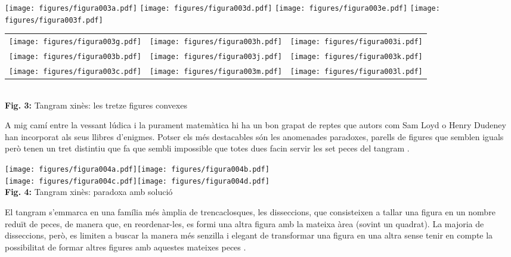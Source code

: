 \documentclass[a4paper,11pt]{article}
\begin{document}
\begin{multicols}{2}
            \begin{center}
                \texttt{[image: figures/figura003a.pdf]}\qquad
                \texttt{[image: figures/figura003d.pdf]}\qquad
                \texttt{[image: figures/figura003e.pdf]}\qquad
                \texttt{[image: figures/figura003f.pdf]}\\ \medskip
                \begin{tabular}{ccc}
                    \texttt{[image: figures/figura003g.pdf]} &
                    \texttt{[image: figures/figura003h.pdf]} &
                    \texttt{[image: figures/figura003i.pdf]} \\[1ex]
                    \texttt{[image: figures/figura003b.pdf]} &
                    \texttt{[image: figures/figura003j.pdf]} &
                    \texttt{[image: figures/figura003k.pdf]} \\[1ex]
                    \texttt{[image: figures/figura003c.pdf]} &
                    \texttt{[image: figures/figura003m.pdf]} &
                    \texttt{[image: figures/figura003l.pdf]} \\[1ex]
                \end{tabular}\\
                \footnotesize{\textbf{Fig. 3:} Tangram xinès: les tretze figures convexes}
            \end{center}

            A mig camí entre la vessant lúdica i la purament matemàtica hi ha un bon grapat de reptes que autors com Sam Loyd o Henry Dudeney han incorporat als seus llibres d'enigmes. Potser els més destacables són les anomenades paradoxes, parells de figures que semblen iguals però tenen un tret distintiu que fa que sembli impossible que totes dues facin servir les set peces del tangram \cite{loyd2007sam}.

            \begin{center}
                \texttt{[image: figures/figura004a.pdf]}\quad\texttt{[image: figures/figura004b.pdf]} \\ \smallskip
                \texttt{[image: figures/figura004c.pdf]}\quad\texttt{[image: figures/figura004d.pdf]} \\
                \footnotesize{\textbf{Fig. 4:} Tangram xinès: paradoxa amb solució}
            \end{center}

            El tangram s'emmarca en una família més àmplia de trencaclosques, les disseccions, que consisteixen a tallar una figura en un nombre reduït de peces, de manera que, en reordenar-les, es formi una altra figura amb la mateixa àrea (sovint un quadrat). La majoria de disseccions, però, es limiten a buscar la manera més senzilla i elegant de transformar una figura en una altra sense tenir en compte la possibilitat de formar altres figures amb aquestes mateixes peces \cite{frederickson1997dissections}.


\end{multicols}
\end{document}
